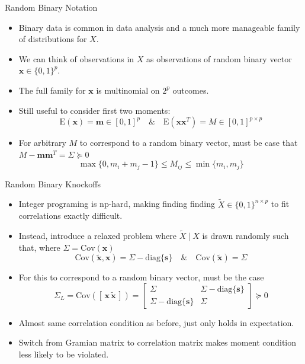 \documentclass{beamer}
\newcommand{\E}{\mathrm{E}}
\newcommand{\cov}{\mathrm{Cov}}
\newcommand{\st}{ \; \big | \:}
\newcommand{\diag}[1]{\mathrm{diag}\{#1\}}
\begin{document}
\begin{frame}{Random Binary Notation}
    \begin{itemize}
        \item Binary data is common in data analysis and a much more manageable family of distributions for $X$.
        \item We can think of observations in $X$ as observations of random binary vector $\mathbf x\in\{0,1\}^p$.
        \item The full family for $\mathbf x$ is multinomial on $2^p$ outcomes.
        \item Still useful to consider first two moments: 
            \[ \E(\mathbf x) = \mathbf{m} \in [0,1]^p \quad \& \quad \E(\mathbf{x}\mathbf{x}^T) = M \in [0,1]^{p\times p} \]
        \item For arbitrary $M$ to correspond to a random binary vector, must be case that $ M-\mathbf{m}\mathbf{m}^T = \Sigma \succeq0$
            \[\max\{0,m_i+m_j -1\} \leq M_{ij} \leq \min\{m_i,m_j\} \]

    \end{itemize}
\end{frame}

\begin{frame}{Random Binary Knockoffs}
    \begin{itemize}
        \item Integer programing is np-hard, making finding finding $\tilde X\in\{0,1\}^{n\times p}$ to fit correlations exactly difficult. 
        \item Instead, introduce a relaxed problem where $\tilde X\st X$ is drawn randomly such that, where $\Sigma=\cov(\mathbf x)$
            \[ \cov(\mathbf{\tilde x}, \mathbf x) = \Sigma - \diag{\mathbf s} \quad \& \quad \cov(\mathbf{\tilde x}) = \Sigma \]
        \item For this to correspond to a random binary vector, must be the case
            \[ \Sigma_L =\cov([\,\mathbf x\,\mathbf{\tilde x}\,]) = \left[ \begin{array}{cc} \Sigma & \Sigma - \diag{\mathbf s} \\ \Sigma - \diag{\mathbf s} & \Sigma \end{array}\right] \succeq 0 \]
        \item Almost same correlation condition as before, just only holds in expectation.
        \item Switch from Gramian matrix to correlation matrix makes moment condition less likely to be violated. 
    \end{itemize}
\end{frame}
\end{document}
